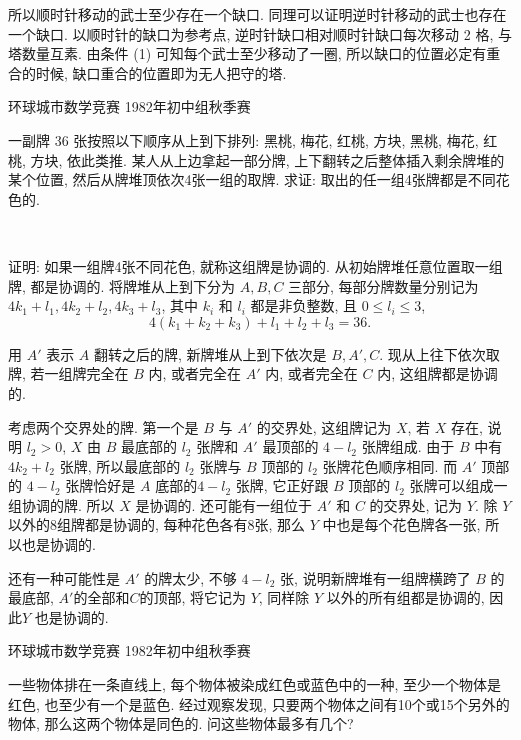 所以顺时针移动的武士至少存在一个缺口. 同理可以证明逆时针移动的武士也存在一个缺口. 以顺时针的缺口为参考点, 逆时针缺口相对顺时针缺口每次移动 2 格, 与塔数量互素. 由条件 (1) 可知每个武士至少移动了一圈, 所以缺口的位置必定有重合的时候, 缺口重合的位置即为无人把守的塔.


\newpage

\noindent 环球城市数学竞赛 1982年初中组秋季赛

一副牌 36 张按照以下顺序从上到下排列: 黑桃, 梅花, 红桃, 方块, 黑桃, 梅花, 红桃, 方块, 依此类推. 某人从上边拿起一部分牌, 上下翻转之后整体插入剩余牌堆的某个位置, 然后从牌堆顶依次4张一组的取牌. 求证: 取出的任一组4张牌都是不同花色的.

~

证明: 如果一组牌4张不同花色, 就称这组牌是协调的. 从初始牌堆任意位置取一组牌, 都是协调的. 将牌堆从上到下分为 $A,B,C$ 三部分, 每部分牌数量分别记为 $4k_1+l_1, 4k_2+l_2, 4k_3+l_3$, 其中 $k_i$ 和 $l_i$ 都是非负整数, 且 $0\le l_i \le 3$, 
\[4(k_1+k_2+k_3) + l_1+l_2+l_3 = 36 .\]

用 $A'$ 表示 $A$ 翻转之后的牌, 新牌堆从上到下依次是 $B, A', C$. 现从上往下依次取牌, 若一组牌完全在 $B$ 内, 或者完全在 $A'$ 内, 或者完全在 $C$ 内, 这组牌都是协调的. 

考虑两个交界处的牌. 第一个是 $B$ 与 $A'$ 的交界处, 这组牌记为 $X$, 若 $X$ 存在, 说明 $l_2 > 0$, $X$ 由 $B$ 最底部的 $l_2$ 张牌和 $A'$ 最顶部的 $4-l_2$ 张牌组成. 由于 $B$ 中有 $4k_2+l_2$ 张牌, 所以最底部的 $l_2$ 张牌与 $B$ 顶部的 $l_2$ 张牌花色顺序相同. 而 $A'$ 顶部的 $4-l_2$ 张牌恰好是 $A$ 底部的$4-l_2$ 张牌, 它正好跟 $B$ 顶部的 $l_2$ 张牌可以组成一组协调的牌. 所以 $X$ 是协调的. 还可能有一组位于 $A'$ 和 $C$ 的交界处, 记为 $Y$. 除 $Y$ 以外的8组牌都是协调的, 每种花色各有8张, 那么 $Y$ 中也是每个花色牌各一张, 所以也是协调的.

还有一种可能性是 $A'$ 的牌太少, 不够 $4-l_2$ 张, 说明新牌堆有一组牌横跨了 $B$ 的最底部, $A'$的全部和$C$的顶部, 将它记为 $Y$, 同样除 $Y$ 以外的所有组都是协调的, 因此$Y$ 也是协调的.


\newpage
\noindent 环球城市数学竞赛 1982年初中组秋季赛

一些物体排在一条直线上, 每个物体被染成红色或蓝色中的一种, 至少一个物体是红色, 也至少有一个是蓝色. 经过观察发现, 只要两个物体之间有10个或15个另外的物体, 那么这两个物体是同色的. 问这些物体最多有几个?

~


